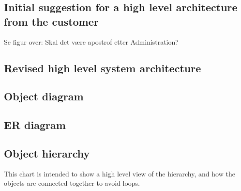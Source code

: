 \subsection{Initial suggestion for a high level architecture from the customer}
Se figur over: Skal det være apostrof etter Administration?

\subsection{Revised high level system architecture}

\subsection{Object diagram}


\subsection{ER diagram}

\subsection{Object hierarchy}
This chart is intended to show a high level view of the hierarchy, and how the objects are connected together to avoid loops. 








